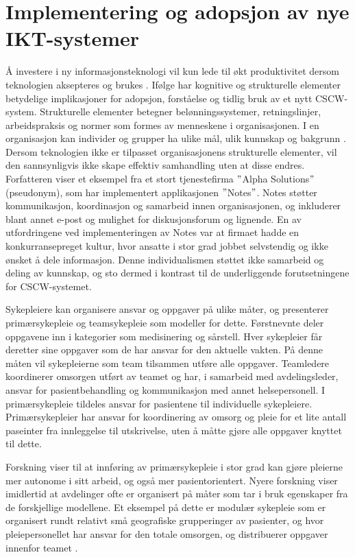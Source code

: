 \section{Implementering og adopsjon av nye IKT-systemer}
\label{sec:implementering}
Å investere i ny informasjonsteknologi vil kun lede til økt produktivitet dersom teknologien aksepteres og brukes \citep{Venkatesh99}. Ifølge \citet{Orlikowski92} har kognitive og strukturelle elementer betydelige implikasjoner for adopsjon, forståelse og tidlig bruk av et nytt CSCW-system. Strukturelle elementer betegner belønningssystemer, retningslinjer, arbeidspraksis og normer som formes av menneskene i organisasjonen. I en organisasjon kan individer og grupper ha ulike mål, ulik kunnskap og bakgrunn \citep{Ackermann00}. Dersom teknologien ikke er tilpasset organisasjonens strukturelle elementer, vil den sannsynligvis ikke skape effektiv samhandling uten at disse endres. Forfatteren viser et eksempel fra et stort tjenestefirma $"$Alpha Solutions$"$ (pseudonym), som har implementert applikasjonen $"$Notes$"$. Notes støtter kommunikasjon, koordinasjon og samarbeid innen organisasjonen, og inkluderer blant annet e-post og mulighet for diskusjonsforum og lignende. En av utfordringene ved implementeringen av Notes var at firmaet hadde en konkurransepreget kultur, hvor ansatte i stor grad jobbet selvstendig og ikke ønsket å dele informasjon. Denne individualismen støttet ikke samarbeid og deling av kunnskap, og sto dermed i kontrast til de underliggende forutsetningene for CSCW-systemet.

\noindent
Sykepleiere kan organisere ansvar og oppgaver på ulike måter, og \citet{Rygh13} presenterer primærsykepleie og teamsykepleie som modeller for dette. Førstnevnte deler oppgavene inn i kategorier som medisinering og sårstell. Hver sykepleier får deretter sine oppgaver som de har ansvar for den aktuelle vakten. På denne måten vil sykepleierne som team tilsammen utføre alle oppgaver. Teamledere koordinerer omsorgen utført av teamet og har, i samarbeid med avdelingsleder, ansvar for pasientbehandling og kommunikasjon med annet helsepersonell. I primærsykepleie tildeles ansvar for pasientene til individuelle sykepleiere. Primærsykepleier har ansvar for koordinering av omsorg og pleie for et lite antall paseinter fra innleggelse til utskrivelse, uten å måtte gjøre alle oppgaver knyttet til dette. 

\noindent
Forskning viser til at innføring av primærsykepleie i stor grad kan gjøre pleierne mer autonome i sitt arbeid, og også mer pasientorientert. Nyere forskning viser imidlertid at avdelinger ofte er organisert på måter som tar i bruk egenskaper fra de forskjellige modellene. Et eksempel på dette er modulær sykepleie som er organisert rundt relativt små geografiske grupperinger av pasienter, og hvor pleiepersonellet har ansvar for den totale omsorgen, og distribuerer oppgaver innenfor teamet \citep{Rygh13}.

